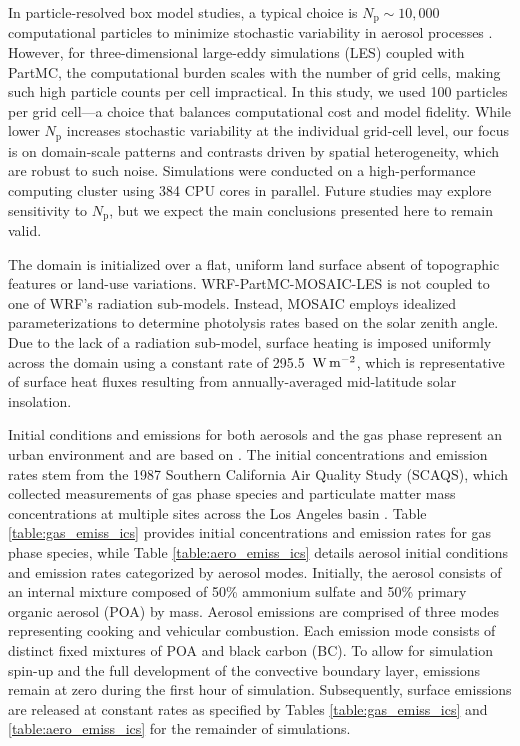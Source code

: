 \documentclass[acp]{copernicus}
\begin{document}
In particle-resolved box model studies, a typical choice is
  $N_{\mathrm{p}} \sim 10{,}000$ computational particles to minimize
  stochastic variability in aerosol processes
  \citep{gmd-17-8399-2024, Liu_2025}.  However, for
  three-dimensional large-eddy simulations (LES) coupled with PartMC,
  the computational burden scales with the number of grid cells,
  making such high particle counts per cell impractical. In this
  study, we used 100 particles per grid cell—a choice that balances
  computational cost and model fidelity. While lower $N_{\mathrm{p}}$
  increases stochastic variability at the individual grid-cell level,
  our focus is on domain-scale patterns and contrasts driven by
  spatial heterogeneity, which are robust to such noise. Simulations
  were conducted on a high-performance computing cluster using 384 CPU
  cores in parallel. Future studies may explore sensitivity to
  $N_{\mathrm{p}}$, but we expect the main conclusions presented here
  to remain valid.

The domain is initialized over a flat, uniform land surface absent of
topographic features or land-use variations. WRF-PartMC-MOSAIC-LES is
not coupled to one of WRF's radiation sub-models. Instead, MOSAIC
employs idealized parameterizations to determine photolysis rates
based on the solar zenith angle. Due to the lack of a radiation
sub-model, surface heating is imposed uniformly across the domain
using a constant rate of 295.5~$\rm W \, m^{-2}$, which is
representative of surface heat fluxes resulting from annually-averaged mid-latitude solar insolation.

Initial conditions and emissions for both aerosols and the gas phase
represent an urban environment and are based on
\citet{riemer_simulating_2009}. The initial concentrations and
emission rates stem from the 1987 Southern California Air Quality
Study (SCAQS), which collected measurements of gas phase species and
particulate matter mass concentrations at multiple sites across the
Los Angeles basin \citep{zaveri_model_2008}. Table
\ref{table:gas_emiss_ics} provides initial concentrations and emission
rates for gas phase species, while Table \ref{table:aero_emiss_ics}
details aerosol initial conditions and emission rates categorized by
aerosol modes. Initially, the aerosol consists of an internal mixture
composed of 50\% ammonium sulfate and 50\% primary organic aerosol
(POA) by mass.  Aerosol emissions are comprised of three modes representing cooking and vehicular combustion. Each emission mode consists of distinct fixed mixtures of POA and black carbon (BC). To allow for simulation spin-up
and the full development of the convective boundary layer, emissions
remain at zero during the first hour of simulation. Subsequently,
surface emissions are released at constant rates as specified by
Tables \ref{table:gas_emiss_ics} and \ref{table:aero_emiss_ics} for
the remainder of simulations.
\end{document}
